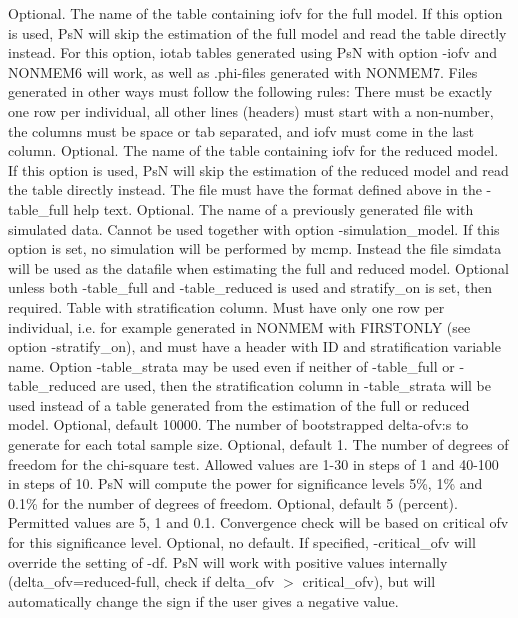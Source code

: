 \begin{optionlist}
\nextopt
{}
Optional. The name of the table containing iofv for the full model. If this option is used, PsN will skip the estimation of the full model and read the table directly instead. For this option, iotab tables generated using PsN with option -iofv and NONMEM6 will work, as well as .phi-files generated with NONMEM7. Files generated in other ways must follow the following rules: There must be exactly one row per individual, all other lines (headers) must start with a non-number, the columns must be space or tab separated, and iofv must come in the last column. 
\nextopt
{}
Optional. The name of the table containing iofv for the reduced model. If this option is used, PsN will skip the estimation of the reduced model and read the table directly instead. The file must have the format defined above in the -table\_full help text. 
\nextopt
{}
Optional. The name of a previously generated file with simulated data. Cannot be used together with option -simulation\_model. If this option is set, no simulation will be performed by mcmp. Instead the file simdata will be used as the datafile when estimating the full and reduced model. 
\nextopt
{}
Optional unless both -table\_full and -table\_reduced is used and stratify\_on is set, then required. Table with stratification column. Must have only one row per individual, i.e. for example generated in NONMEM with FIRSTONLY (see option -stratify\_on), and must have a header with ID and stratification variable name. Option -table\_strata may be used even if neither of -table\_full or -table\_reduced are used, then the stratification column in -table\_strata will be used instead of a table generated from the estimation of the full or reduced model. 
\nextopt
{}
Optional, default 10000. The number of bootstrapped delta-ofv:s to generate for each total sample size. 
\nextopt
{}
Optional, default 1. The number of degrees of freedom for the chi-square test. Allowed values are 1-30 in steps of 1 and 40-100 in steps of 10. PsN will compute the power for significance levels 5\%, 1\% and 0.1\% for the number of degrees of freedom. 
\nextopt
{}
Optional, default 5 (percent). Permitted values are 5, 1 and 0.1. Convergence check will be based on critical ofv for this significance level. 
\nextopt
{}
Optional, no default. If specified, -critical\_ofv will override the setting of -df. PsN will work with positive values internally (delta\_ofv=reduced-full, check if delta\_ofv $>$ critical\_ofv), but will automatically change the sign if the user gives a negative value. 
\nextopt
\end{optionlist}

